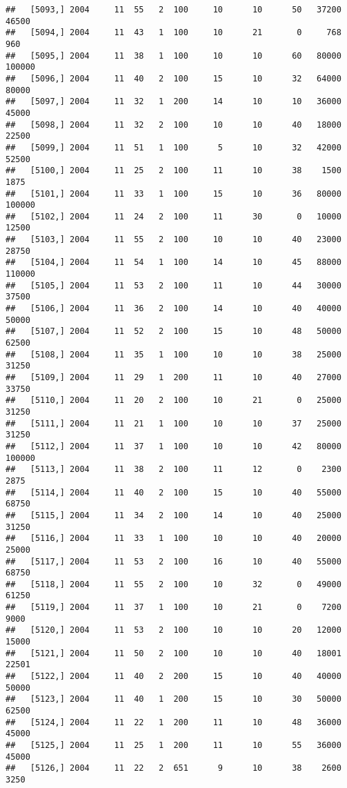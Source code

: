 \documentclass{article}\usepackage[]{graphicx}\usepackage[]{color}
\makeatletter
\newenvironment{kframe}{%
 \def\at@end@of@kframe{}%
 \ifinner\ifhmode%
  \def\at@end@of@kframe{\end{minipage}}%
  \begin{minipage}{\columnwidth}%
 \fi\fi%
 \def\FrameCommand##1{\hskip\@totalleftmargin \hskip-\fboxsep
 \colorbox{shadecolor}{##1}\hskip-\fboxsep
     \hskip-\linewidth \hskip-\@totalleftmargin \hskip\columnwidth}%
 \MakeFramed {\advance\hsize-\width
   \@totalleftmargin\z@ \linewidth\hsize
   \@setminipage}}%
 {\par\unskip\endMakeFramed%
 \at@end@of@kframe}
\newenvironment{knitrout}{}{} %
\makeatother
\begin{document}
\begin{knitrout}
\begin{kframe}
\begin{verbatim}
##   [5093,] 2004     11  55   2  100     10      10      50   37200   46500
##   [5094,] 2004     11  43   1  100     10      21       0     768     960
##   [5095,] 2004     11  38   1  100     10      10      60   80000  100000
##   [5096,] 2004     11  40   2  100     15      10      32   64000   80000
##   [5097,] 2004     11  32   1  200     14      10      10   36000   45000
##   [5098,] 2004     11  32   2  100     10      10      40   18000   22500
##   [5099,] 2004     11  51   1  100      5      10      32   42000   52500
##   [5100,] 2004     11  25   2  100     11      10      38    1500    1875
##   [5101,] 2004     11  33   1  100     15      10      36   80000  100000
##   [5102,] 2004     11  24   2  100     11      30       0   10000   12500
##   [5103,] 2004     11  55   2  100     10      10      40   23000   28750
##   [5104,] 2004     11  54   1  100     14      10      45   88000  110000
##   [5105,] 2004     11  53   2  100     11      10      44   30000   37500
##   [5106,] 2004     11  36   2  100     14      10      40   40000   50000
##   [5107,] 2004     11  52   2  100     15      10      48   50000   62500
##   [5108,] 2004     11  35   1  100     10      10      38   25000   31250
##   [5109,] 2004     11  29   1  200     11      10      40   27000   33750
##   [5110,] 2004     11  20   2  100     10      21       0   25000   31250
##   [5111,] 2004     11  21   1  100     10      10      37   25000   31250
##   [5112,] 2004     11  37   1  100     10      10      42   80000  100000
##   [5113,] 2004     11  38   2  100     11      12       0    2300    2875
##   [5114,] 2004     11  40   2  100     15      10      40   55000   68750
##   [5115,] 2004     11  34   2  100     14      10      40   25000   31250
##   [5116,] 2004     11  33   1  100     10      10      40   20000   25000
##   [5117,] 2004     11  53   2  100     16      10      40   55000   68750
##   [5118,] 2004     11  55   2  100     10      32       0   49000   61250
##   [5119,] 2004     11  37   1  100     10      21       0    7200    9000
##   [5120,] 2004     11  53   2  100     10      10      20   12000   15000
##   [5121,] 2004     11  50   2  100     10      10      40   18001   22501
##   [5122,] 2004     11  40   2  200     15      10      40   40000   50000
##   [5123,] 2004     11  40   1  200     15      10      30   50000   62500
##   [5124,] 2004     11  22   1  200     11      10      48   36000   45000
##   [5125,] 2004     11  25   1  200     11      10      55   36000   45000
##   [5126,] 2004     11  22   2  651      9      10      38    2600    3250

\end{verbatim}
\end{kframe}
\end{knitrout}
\end{document}
